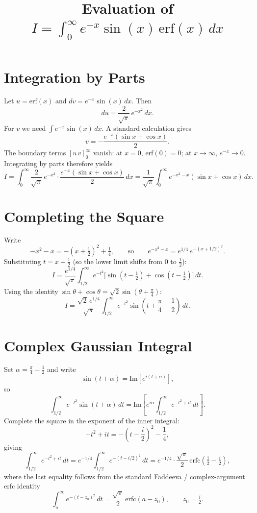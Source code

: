 \documentclass{article}
\title{Evaluation of $\displaystyle I = \int_0^\infty e^{-x}\sin(x)\,\mathrm{erf}(x)\,dx$}
\author{}
\date{}
\begin{document}
\maketitle

\section{Integration by Parts}

Let $u = \mathrm{erf}(x)$ and $dv = e^{-x}\sin(x)\,dx$. Then
\[
  du = \frac{2}{\sqrt{\pi}}\,e^{-x^2}\,dx.
\]
For $v$ we need $\int e^{-x}\sin(x)\,dx$. A standard calculation gives
\[
  v = -\frac{e^{-x}(\sin x + \cos x)}{2}.
\]
The boundary terms $[u\,v]_0^\infty$ vanish: at $x=0$, $\mathrm{erf}(0)=0$; at $x\to\infty$, $e^{-x}\to 0$.
Integrating by parts therefore yields
\[
  I = \int_0^\infty \frac{2}{\sqrt{\pi}}\,e^{-x^2}\cdot\frac{e^{-x}(\sin x + \cos x)}{2}\,dx
    = \frac{1}{\sqrt{\pi}}\int_0^\infty e^{-x^2-x}(\sin x + \cos x)\,dx.
\]

\section{Completing the Square}

Write
\[
  -x^2 - x = -\!\left(x + \tfrac{1}{2}\right)^2 + \tfrac{1}{4},
  \qquad\text{so}\qquad
  e^{-x^2-x} = e^{1/4}\,e^{-(x+1/2)^2}.
\]
Substituting $t = x + \tfrac{1}{2}$ (so the lower limit shifts from $0$ to $\tfrac{1}{2}$):
\[
  I = \frac{e^{1/4}}{\sqrt{\pi}}\int_{1/2}^\infty e^{-t^2}
      \bigl[\sin\!\left(t-\tfrac{1}{2}\right)+\cos\!\left(t-\tfrac{1}{2}\right)\bigr]\,dt.
\]
Using the identity $\sin\theta + \cos\theta = \sqrt{2}\sin\!\left(\theta+\tfrac{\pi}{4}\right)$:
\[
  I = \frac{\sqrt{2}\,e^{1/4}}{\sqrt{\pi}}\int_{1/2}^\infty e^{-t^2}\sin\!\left(t + \frac{\pi}{4} - \frac{1}{2}\right)\,dt.
\]

\section{Complex Gaussian Integral}

Set $\alpha = \frac{\pi}{4} - \frac{1}{2}$ and write
\[
  \sin(t+\alpha) = \mathrm{Im}\!\left[e^{i(t+\alpha)}\right],
\]
so
\[
  \int_{1/2}^\infty e^{-t^2}\sin(t+\alpha)\,dt
  = \mathrm{Im}\!\left[e^{i\alpha}\int_{1/2}^\infty e^{-t^2+it}\,dt\right].
\]
Complete the square in the exponent of the inner integral:
\[
  -t^2 + it = -\!\left(t - \frac{i}{2}\right)^2 - \frac{1}{4},
\]
giving
\[
  \int_{1/2}^\infty e^{-t^2+it}\,dt
  = e^{-1/4}\int_{1/2}^\infty e^{-(t-i/2)^2}\,dt
  = e^{-1/4}\cdot\frac{\sqrt{\pi}}{2}\,\mathrm{erfc}\!\left(\tfrac{1}{2}-\tfrac{i}{2}\right),
\]
where the last equality follows from the standard Faddeeva / complex-argument erfc identity
\[
  \int_a^\infty e^{-(t-z_0)^2}\,dt = \frac{\sqrt{\pi}}{2}\,\mathrm{erfc}(a - z_0),
  \qquad z_0 = \tfrac{i}{2}.
\]
\end{document}
